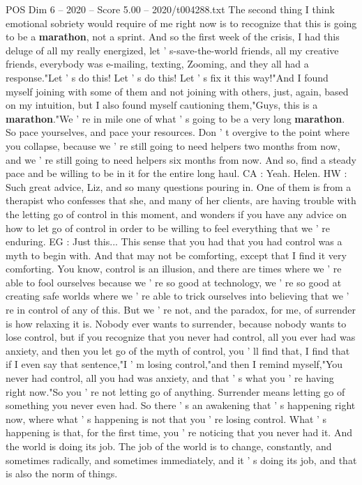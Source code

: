 \begin{textsample}{POS Dim 6 – 2020 – Score 5.00 – 2020/t004288.txt}
The second thing I think emotional sobriety would require of me right now is to recognize that this is going to be a \textbf{marathon}, not a sprint.
And so the first week of the crisis, I had this deluge of all my really energized, let ' s-save-the-world friends, all my creative friends, everybody was e-mailing, texting, Zooming, and they all had a response."Let ' s do this!
Let ' s do this!
Let ' s fix it this way!"And I found myself joining with some of them and not joining with others, just, again, based on my intuition, but I also found myself cautioning them,"Guys, this is a \textbf{marathon}."We ' re in mile one of what ' s going to be a very long \textbf{marathon}.
So pace yourselves, and pace your resources.
Don ' t overgive to the point where you collapse, because we ' re still going to need helpers two months from now, and we ' re still going to need helpers six months from now.
And so, find a steady pace and be willing to be in it for the entire long haul.
CA : Yeah.
Helen.
HW : Such great advice, Liz, and so many questions pouring in.
One of them is from a therapist who confesses that she, and many of her clients, are having trouble with the letting go of control in this moment, and wonders if you have any advice on how to let go of control in order to be willing to feel everything that we ' re enduring.
EG : Just this...
This sense that you had that you had control was a myth to begin with.
And that may not be comforting, except that I find it very comforting.
You know, control is an illusion, and there are times where we ' re able to fool ourselves because we ' re so good at technology, we ' re so good at creating safe worlds where we ' re able to trick ourselves into believing that we ' re in control of any of this.
But we ' re not, and the paradox, for me, of surrender is how relaxing it is.
Nobody ever wants to surrender, because nobody wants to lose control, but if you recognize that you never had control, all you ever had was anxiety, and then you let go of the myth of control, you ' ll find that, I find that if I even say that sentence,"I ' m losing control,"and then I remind myself,"You never had control, all you had was anxiety, and that ' s what you ' re having right now."So you ' re not letting go of anything.
Surrender means letting go of something you never even had.
So there ' s an awakening that ' s happening right now, where what ' s happening is not that you ' re losing control.
What ' s happening is that, for the first time, you ' re noticing that you never had it.
And the world is doing its job.
The job of the world is to change, constantly, and sometimes radically, and sometimes immediately, and it ' s doing its job, and that is also the norm of things.

\end{textsample}
